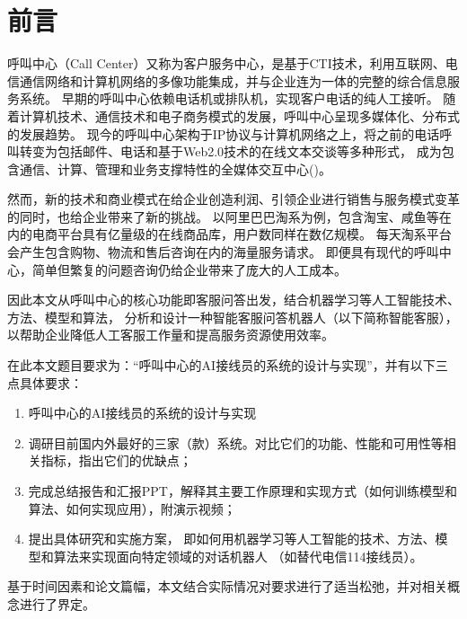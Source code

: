 \section*{前言}
\label{section:before}

呼叫中心（Call Center）又称为客户服务中心，是基于CTI技术，利用互联网、电信通信网络和计算机网络的多像功能集成，并与企业连为一体的完整的综合信息服务系统。
早期的呼叫中心依赖电话机或排队机，实现客户电话的纯人工接听。
随着计算机技术、通信技术和电子商务模式的发展，呼叫中心呈现多媒体化、分布式的发展趋势。
现今的呼叫中心架构于IP协议与计算机网络之上，将之前的电话呼叫转变为包括邮件、电话和基于Web2.0技术的在线文本交谈等多种形式，
成为包含通信、计算、管理和业务支撑特性的全媒体交互中心(\citet{马晓军-1})。

然而，新的技术和商业模式在给企业创造利润、引领企业进行销售与服务模式变革的同时，也给企业带来了新的挑战。
以阿里巴巴淘系为例，包含淘宝、咸鱼等在内的电商平台具有亿量级的在线商品库，用户数同样在数亿规模。
每天淘系平台会产生包含购物、物流和售后咨询在内的海量服务请求。
即便具有现代的呼叫中心，简单但繁复的问题咨询仍给企业带来了庞大的人工成本。

因此本文从呼叫中心的核心功能即客服问答出发，结合机器学习等人工智能技术、方法、模型和算法，
分析和设计一种智能客服问答机器人（以下简称智能客服），以帮助企业降低人工客服工作量和提高服务资源使用效率。

在此本文题目要求为：“呼叫中心的AI接线员的系统的设计与实现”，并有以下三点具体要求：

\begin{enumerate}[leftmargin=3.5em,itemindent=0em,label=(\arabic*),itemsep=0pt,topsep=0pt]
    \item[\textasteriskcentered] 呼叫中心的AI接线员的系统的设计与实现
    \item 
    调研目前国内外最好的三家（款）系统。对比它们的功能、性能和可用性等相关指标，指出它们的优缺点；
    \item 
    完成总结报告和汇报PPT，解释其主要工作原理和实现方式（如何训练模型和算法、如何实现应用），附演示视频；
    \item 
    提出具体研究和实施方案，
    即如何用机器学习等人工智能的技术、方法、模型和算法来实现面向特定领域的对话机器人
    （如替代电信114接线员）。
\end{enumerate}

基于时间因素和论文篇幅，本文结合实际情况对要求进行了适当松弛，并对相关概念进行了界定。

